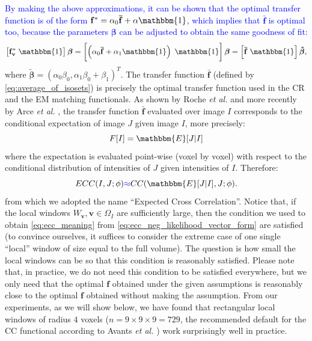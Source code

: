 \textcolor{blue}{By making the above approximations, it can be shown that the optimal transfer function is of the form $\mathbf{f^{*}} = \alpha_{0} \mathbf{\bar{f}} + \alpha\mathbbm{1}$, which implies that $\mathbf{\bar{f}}$ is optimal too, because the parameters $\boldsymbol{\beta}$ can be adjusted to obtain the same goodness of fit:
\begin{displaymath}
    \left[\mathbf{f^{*}_{v}} \; \mathbbm{1}\right]\boldsymbol{\beta} = 
    \left[\left(\alpha_{0} \mathbf{\bar{f}} + \alpha_{1}\mathbbm{1}\right) \; \mathbbm{1}\right]\boldsymbol{\beta} =
    \left[\mathbf{\bar{f}} \; \mathbbm{1}\right]\boldsymbol{\tilde{\beta}},
\end{displaymath}
}where $\boldsymbol{\tilde{\beta}} = (\alpha_{0}\beta_{0}, \alpha_{1}\beta_{0} + \beta_{1})^{T}$. The transfer function $\mathbf{\bar{f}}$ (defined by \eqref{eq:average_of_isosets}) is precisely the optimal transfer function used in the CR and the EM matching functionals. As shown by Roche {\it et al.} \cite{Roche1998, Roche2000} and more recently by Arce {\it et al.} \cite{Arce-santana2014}, the transfer function $\mathbf{\bar{f}}$ evaluated over image $I$ corresponds to the conditional expectation of image $J$ given image $I$, more precisely:
\begin{equation*}
    F[I] = \mathbbm{E}[J | I]
\end{equation*}
where the expectation is evaluated point-wise (voxel by voxel) with respect to the conditional distribution of intensities of $J$ given intensities of $I$. Therefore:
\begin{equation}\label{eq:ecc_meaning}
    ECC(I, J; \phi) \textcolor{blue}{\approx} CC(\mathbbm{E}[J|I], J ; \phi).
\end{equation}
from which we adopted the name ``Expected Cross Correlation''. Notice that, if the local windows $W_{\mathbf{v}}, \mathbf{v}\in\Omega_{I}$ are sufficiently large, then the condition we used to obtain \eqref{eq:ecc_meaning} from \eqref{eq:ecc_neg_likelihood_vector_form} are satisfied (to convince ourselves, it suffices to consider the extreme case of one single ``local'' window of size equal to the full volume). The question is how small the local windows can be so that this condition is reasonably satisfied. Please note that, in practice, we do not need this condition to be satisfied everywhere, but we only need that the optimal $\mathbf{f}$ obtained under the given assumptions is reasonably close to the optimal $\mathbf{f}$ obtained without making the assumption. From our experiments, as we will show below, we have found that rectangular local windows of radius $4$ voxels ($n=9\times 9\times 9 = 729$, the recommended default for the CC functional according to Avants {\it et al.} \cite{Avants2011}) work surprisingly well in practice.\\

